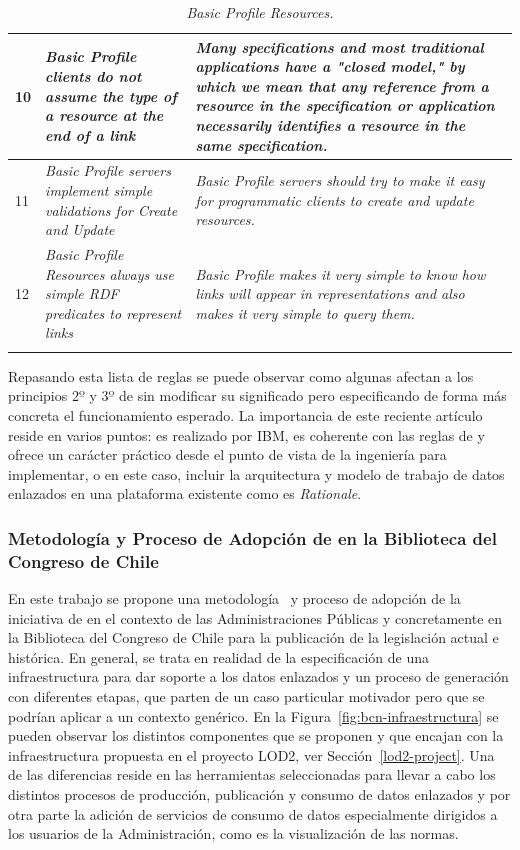 \begin{longtable}[c]{|l|p{7cm}|p{8cm}|}
  10 &  \textit{Basic Profile clients do not assume the type of a resource at the end of a link} &   \textit{Many specifications and most traditional applications have a "closed model," by which we mean that any reference from a resource in the specification or application necessarily identifies a resource in the same specification.} \\ \hline
  11 &  \textit{Basic Profile servers implement simple validations for Create and Update} &   \textit{Basic Profile servers should try to make it easy for programmatic clients to create and update resources.} \\ \hline
  12 &  \textit{Basic Profile Resources always use simple RDF predicates to represent links} &   \textit{Basic Profile makes it very simple to know how links will appear in representations and also makes it very simple to query them.} \\ \hline
\hline
\caption{\textit{Basic Profile Resources.}}\label{table:basic-ibm}\\    
\end{longtable}

Repasando esta lista de reglas se puede observar como algunas afectan a los principios $2º$ y $3º$ de \linkeddata sin
modificar su significado pero especificando de forma más concreta el funcionamiento esperado. La importancia
de este reciente artículo reside en varios puntos: es realizado por IBM, es coherente con las reglas de \linkeddata y
ofrece un carácter práctico desde el punto de vista de la ingeniería para implementar, o en este caso, incluir
la arquitectura y modelo de trabajo de datos enlazados en una plataforma existente como es \textit{Rationale}.


\subsubsection{Metodología y Proceso de Adopción de \linkeddata en la Biblioteca del Congreso de Chile}
En este trabajo se propone una metodología~\cite{DBLP:conf/i-semantics/Cifuentes-SilvaSG11,methodologyCaepia2011} y proceso de adopción de la iniciativa de \linkeddata en el contexto
de las Administraciones Públicas y concretamente en la Biblioteca del Congreso de Chile para la publicación
de la legislación actual e histórica. En general, se trata en realidad de la especificación de una infraestructura
para dar soporte a los datos enlazados y un proceso de generación con diferentes etapas, que parten de un
caso particular motivador pero que se podrían aplicar a un contexto genérico. En la Figura~\ref{fig:bcn-infraestructura} se
pueden observar los distintos componentes que se proponen y que encajan con la infraestructura propuesta en 
el proyecto LOD2, ver Sección~\ref{lod2-project}. Una de las diferencias reside en las herramientas seleccionadas
para llevar a cabo los distintos procesos de producción, publicación y consumo de datos enlazados y por otra parte la
adición de servicios de consumo de datos especialmente dirigidos a los usuarios de la Administración, como es la visualización
de las normas.

